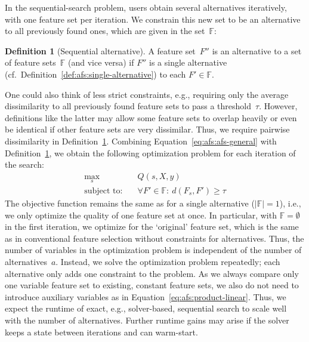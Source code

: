 \documentclass{article}
\theoremstyle{definition}
\newtheorem{definition}{Definition}
\begin{document}
In the sequential-search problem, users obtain several alternatives iteratively, with one feature set per iteration.
We constrain this new set to be an alternative to all previously found ones, which are given in the set~$\mathbb{F}$:
%
\begin{definition}[Sequential alternative]
	A feature set~$F''$ is an alternative to a set of feature sets~$\mathbb{F}$ (and vice versa) if $F''$ is a single alternative (cf.~Definition~\ref{def:afs:single-alternative}) to each $F' \in \mathbb{F}$.
	\label{def:afs:sequential-alternative}
\end{definition}
%
One could also think of less strict constraints, e.g., requiring only the average dissimilarity to all previously found feature sets to pass a threshold~$\tau$.
However, definitions like the latter may allow some feature sets to overlap heavily or even be identical if other feature sets are very dissimilar.
Thus, we require pairwise dissimilarity in Definition~\ref{def:afs:sequential-alternative}.
Combining Equation~\ref{eq:afs:afs-general} with Definition~\ref{def:afs:sequential-alternative}, we obtain the following optimization problem for each iteration of the search:
%
\begin{equation}
	\begin{aligned}
		\max_s &\quad Q(s,X,y) \\
		\text{subject to:} &\quad \forall F' \in \mathbb{F}:~d(F_s,F') \geq \tau
	\end{aligned}
	\label{eq:afs:afs-sequential}
\end{equation}
%
The objective function remains the same as for a single alternative ($|\mathbb{F}| = 1$), i.e., we only optimize the quality of one feature set at once.
In particular, with $\mathbb{F} = \emptyset$ in the first iteration, we optimize for the `original' feature set, which is the same as in conventional feature selection without constraints for alternatives.
Thus, the number of variables in the optimization problem is independent of the number of alternatives~$a$.
Instead, we solve the optimization problem repeatedly; each alternative only adds one constraint to the problem.
As we always compare only one variable feature set to existing, constant feature sets, we also do not need to introduce auxiliary variables as in Equation~\ref{eq:afs:product-linear}.
Thus, we expect the runtime of exact, e.g., solver-based, sequential search to scale well with the number of alternatives.
Further runtime gains may arise if the solver keeps a state between iterations and can warm-start.
\end{document}
